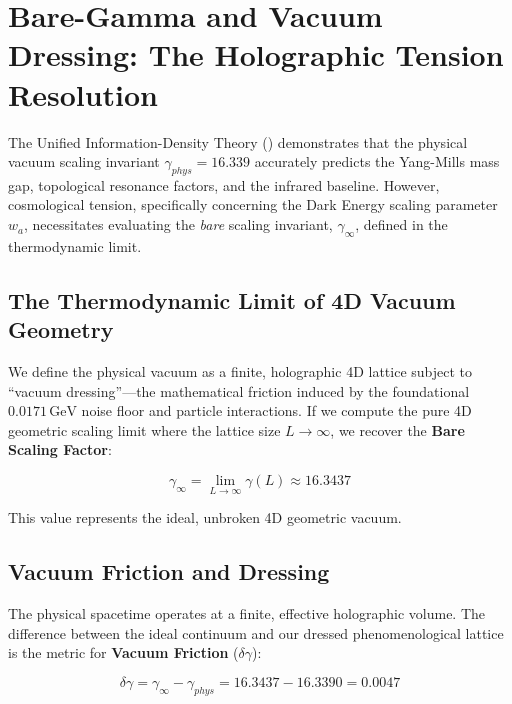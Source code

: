\section{Bare-Gamma and Vacuum Dressing: The Holographic Tension Resolution}
\label{app:bare_gamma}

The Unified Information-Density Theory (\UIDT{}) demonstrates that the physical vacuum scaling invariant $\gamma_{phys} = 16.339$ accurately predicts the Yang-Mills mass gap, topological resonance factors, and the infrared baseline. However, cosmological tension, specifically concerning the Dark Energy scaling parameter $w_a$, necessitates evaluating the \textit{bare} scaling invariant, $\gamma_{\infty}$, defined in the thermodynamic limit.

\subsection{The Thermodynamic Limit of 4D Vacuum Geometry}

We define the physical vacuum as a finite, holographic 4D lattice subject to ``vacuum dressing''---the mathematical friction induced by the foundational $0.0171\,\text{GeV}$ noise floor and particle interactions. If we compute the pure 4D geometric scaling limit where the lattice size $L \rightarrow \infty$, we recover the \textbf{Bare Scaling Factor}:

\begin{equation}
\gamma_{\infty} = \lim_{L \rightarrow \infty} \gamma(L) \approx 16.3437
\end{equation}

This value represents the ideal, unbroken 4D geometric vacuum. 

\subsection{Vacuum Friction and Dressing}

The physical spacetime operates at a finite, effective holographic volume. The difference between the ideal continuum and our dressed phenomenological lattice is the metric for \textbf{Vacuum Friction} ($\delta\gamma$):

\begin{equation}
\delta\gamma = \gamma_{\infty} - \gamma_{phys} = 16.3437 - 16.3390 = 0.0047
\end{equation}

